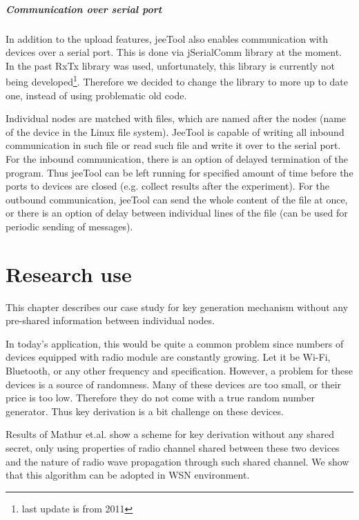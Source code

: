 \documentclass[
  print, %
  Table,   %
  nolof,     %
  nolot,     %
           oneside
]{fithesis3}
\begin{document}
\paragraph{Communication over serial port}
  In addition to the upload features, jeeTool also enables communication with devices over a serial port. This is done via jSerialComm library \cite{jserial} at the moment. In the past RxTx library \cite{rxtx} was used, unfortunately, this library is currently not being developed\footnote{last update is from 2011}. Therefore we decided to change the library to more up to date one, instead of using problematic old code.

  Individual nodes are matched with files, which are named after the nodes (name of the device in the Linux file system). JeeTool is capable of writing all inbound communication in such file or read such file and write it over to the serial port. For the inbound communication, there is an option of delayed termination of the program. Thus jeeTool can be left running for specified amount of time before the ports to devices are closed (e.g. collect results after the experiment). For the outbound communication, jeeTool can send the whole content of the file at once, or there is an option of delay between individual lines of the file (can be used for periodic sending of messages).



\chapter{Research use}\label{ch:research}
  This chapter describes our case study for key generation mechanism without any pre-shared information between individual nodes.

  In today's application, this would be quite a common problem since numbers of devices equipped with radio module are constantly growing. Let it be Wi-Fi, Bluetooth, or any other frequency and specification. However, a problem for these devices is a source of randomness. Many of these devices are too small, or their price is too low. Therefore they do not come with a true random number generator. Thus key derivation is a bit challenge on these devices.

  Results of Mathur et.al. \cite{Mathur2008Rssi} show a scheme for key derivation without any shared secret, only using properties of radio channel shared between these two devices and the nature of radio wave propagation through such shared channel. We show that this algorithm can be adopted in WSN environment.
\end{document}
